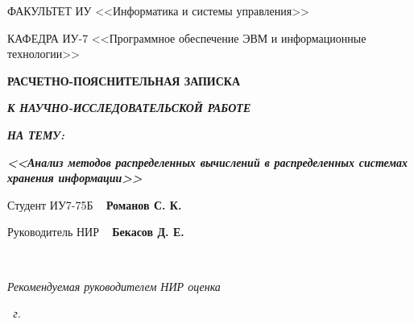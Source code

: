 \begin{titlepage}
\begin{flushleft}
		ФАКУЛЬТЕТ ИУ <<Информатика и системы управления>>

		КАФЕДРА ИУ-7 <<Программное обеспечение ЭВМ и информационные технологии>>
	\end{flushleft}

	\vfill

	\begin{center}
		\fontsize{20pt}{\baselineskip}\selectfont

		\textbf{РАСЧЕТНО-ПОЯСНИТЕЛЬНАЯ ЗАПИСКА}

		\textbf{\textit{К НАУЧНО-ИССЛЕДОВАТЕЛЬСКОЙ РАБОТЕ}}

		\textbf{\textit{НА ТЕМУ:}}
	\end{center}

	\begin{center}
		\fontsize{20pt}{0.6cm}\selectfont 
		
		\textit{\bfseries{<<Анализ методов распределенных вычислений в распределенных системах хранения информации>>}}
		
	\end{center}

	\vfill
	
	\fontsize{12pt}{0.6cm}\selectfont
	Студент \hspace{1.1cm} ИУ7-75Б \hspace{3.83cm} \uline{\mbox{\hspace*{3.5cm}}}~ \textbf{Романов С. К.}
	
	\vfill
	
	Руководитель НИР \hspace{4.8cm} \uline{\mbox{\hspace*{3.5cm}}}~ \textbf{Бекасов Д. Е.}
	
	~~
	
	\textit{Рекомендуемая руководителем НИР оценка}~\uline{\mbox{\hspace*{3.5cm}}}
	
	\vfill

	\begin{center}
		\normalsize \textit{\the \year~г.}
	\end{center}
\end{titlepage}
